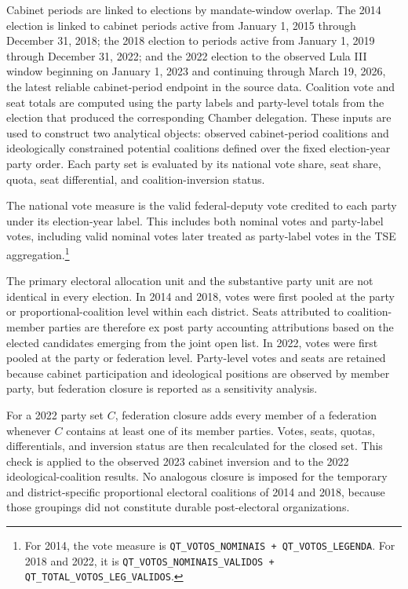 \documentclass[11pt]{article}
\begin{document}
Cabinet periods are linked to elections by mandate-window overlap. The 2014
election is linked to cabinet periods active from January 1, 2015 through
December 31, 2018; the 2018 election to periods active from January 1, 2019
through December 31, 2022; and the 2022 election to the observed Lula III window
beginning on January 1, 2023 and continuing through March 19, 2026, the latest reliable cabinet-period endpoint in the source data. Coalition vote and seat totals are computed using the party labels and
party-level totals from the election that produced the corresponding Chamber
delegation. These inputs are used to construct two analytical objects:
observed cabinet-period coalitions and ideologically constrained potential
coalitions defined over the fixed election-year party order.
Each party set is evaluated by its national vote share, seat share, quota, seat
differential, and coalition-inversion status.

The national vote measure is the valid federal-deputy vote credited to each
party under its election-year label. This includes both nominal votes and
party-label votes, including valid nominal votes later treated as party-label
votes in the TSE aggregation.\footnote{For 2014, the vote measure is
\texttt{QT\_VOTOS\_NOMINAIS + QT\_VOTOS\_LEGENDA}. For 2018 and 2022, it is
\texttt{QT\_VOTOS\_NOMINAIS\_VALIDOS + QT\_TOTAL\_VOTOS\_LEG\_VALIDOS}.}

The primary electoral allocation unit and the substantive party unit are not
identical in every election. In 2014 and 2018, votes were first pooled at the
party or proportional-coalition level within each district. Seats attributed
to coalition-member parties are therefore ex post party accounting
attributions based on the elected candidates emerging from the joint open
list. In 2022, votes were first pooled at the party or federation level.
Party-level votes and seats are retained because cabinet participation and
ideological positions are observed by member party, but federation closure is
reported as a sensitivity analysis.

For a 2022 party set \(C\), federation closure adds every member of a
federation whenever \(C\) contains at least one of its member parties. Votes,
seats, quotas, differentials, and inversion status are then recalculated for
the closed set. This check is applied to the observed 2023 cabinet inversion
and to the 2022 ideological-coalition results. No analogous closure is imposed
for the temporary and district-specific proportional electoral coalitions of
2014 and 2018, because those groupings did not constitute durable
post-electoral organizations.
\end{document}
